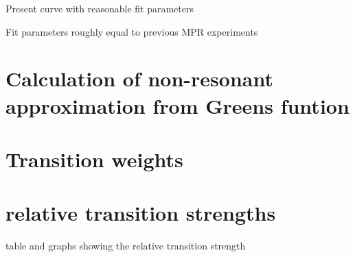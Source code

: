 \documentclass[prl,aps,superscriptaddress,preprint]{revtex4-1}
\begin{document}
Present curve with reasonable fit parameters

Fit parameters roughly equal to previous MPR experiments

\section{Calculation of non-resonant approximation from Greens funtion}

\section{Transition weights}

\section{relative transition strengths}

table and graphs showing the relative transition strength


 


%
%

%



\end{document}
